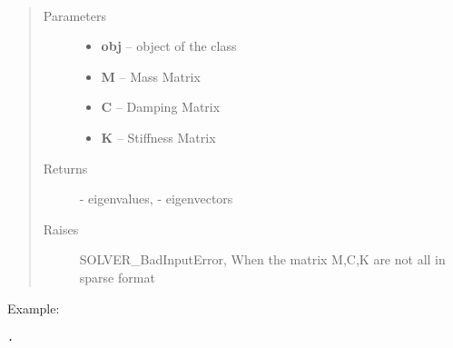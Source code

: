 \documentclass[letterpaper,10pt,english]{sphinxmanual}
\begin{document}
\begin{fulllineitems}
\label{index:brake.solve.solver.qev_sparse}~\begin{quote}\begin{description}
\item[{Parameters}] \leavevmode\begin{itemize}
\item {} 
\textbf{obj} -- object of the class 

\item {} 
\textbf{M} -- Mass Matrix

\item {} 
\textbf{C} -- Damping Matrix

\item {} 
\textbf{K} -- Stiffness Matrix

\end{itemize}

\item[{Returns}] \leavevmode
{} - eigenvalues,  - eigenvectors

\item[{Raises }] \leavevmode
SOLVER\_BadInputError, When the matrix M,C,K are not all in sparse format

\end{description}\end{quote}

Example:

\begin{Verbatim}[commandchars=\\\{\}]
.
\end{Verbatim}

\end{fulllineitems}



\end{document}

